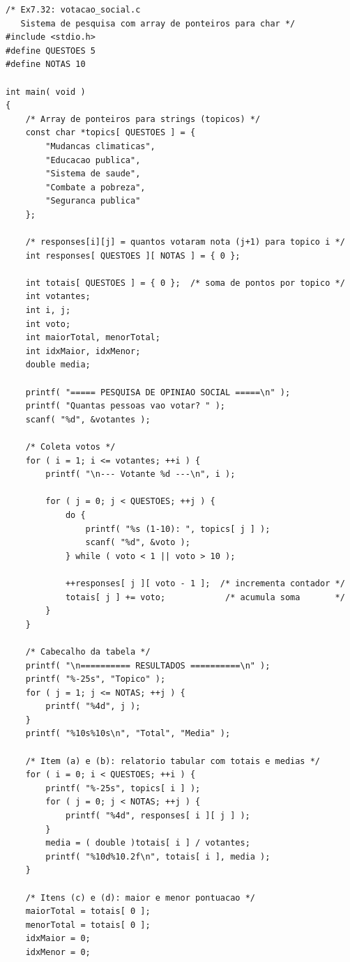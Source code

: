 \documentclass[12pt,a4paper]{article}
\begin{document}
\begin{respostabox}
\begin{lstlisting}
/* Ex7.32: votacao_social.c
   Sistema de pesquisa com array de ponteiros para char */
#include <stdio.h>
#define QUESTOES 5
#define NOTAS 10

int main( void )
{
    /* Array de ponteiros para strings (topicos) */
    const char *topics[ QUESTOES ] = {
        "Mudancas climaticas",
        "Educacao publica",
        "Sistema de saude",
        "Combate a pobreza",
        "Seguranca publica"
    };

    /* responses[i][j] = quantos votaram nota (j+1) para topico i */
    int responses[ QUESTOES ][ NOTAS ] = { 0 };

    int totais[ QUESTOES ] = { 0 };  /* soma de pontos por topico */
    int votantes;
    int i, j;
    int voto;
    int maiorTotal, menorTotal;
    int idxMaior, idxMenor;
    double media;

    printf( "===== PESQUISA DE OPINIAO SOCIAL =====\n" );
    printf( "Quantas pessoas vao votar? " );
    scanf( "%d", &votantes );

    /* Coleta votos */
    for ( i = 1; i <= votantes; ++i ) {
        printf( "\n--- Votante %d ---\n", i );

        for ( j = 0; j < QUESTOES; ++j ) {
            do {
                printf( "%s (1-10): ", topics[ j ] );
                scanf( "%d", &voto );
            } while ( voto < 1 || voto > 10 );

            ++responses[ j ][ voto - 1 ];  /* incrementa contador */
            totais[ j ] += voto;            /* acumula soma       */
        }
    }

    /* Cabecalho da tabela */
    printf( "\n========== RESULTADOS ==========\n" );
    printf( "%-25s", "Topico" );
    for ( j = 1; j <= NOTAS; ++j ) {
        printf( "%4d", j );
    }
    printf( "%10s%10s\n", "Total", "Media" );

    /* Item (a) e (b): relatorio tabular com totais e medias */
    for ( i = 0; i < QUESTOES; ++i ) {
        printf( "%-25s", topics[ i ] );
        for ( j = 0; j < NOTAS; ++j ) {
            printf( "%4d", responses[ i ][ j ] );
        }
        media = ( double )totais[ i ] / votantes;
        printf( "%10d%10.2f\n", totais[ i ], media );
    }

    /* Itens (c) e (d): maior e menor pontuacao */
    maiorTotal = totais[ 0 ];
    menorTotal = totais[ 0 ];
    idxMaior = 0;
    idxMenor = 0;


\end{lstlisting}
\end{respostabox}
\end{document}
